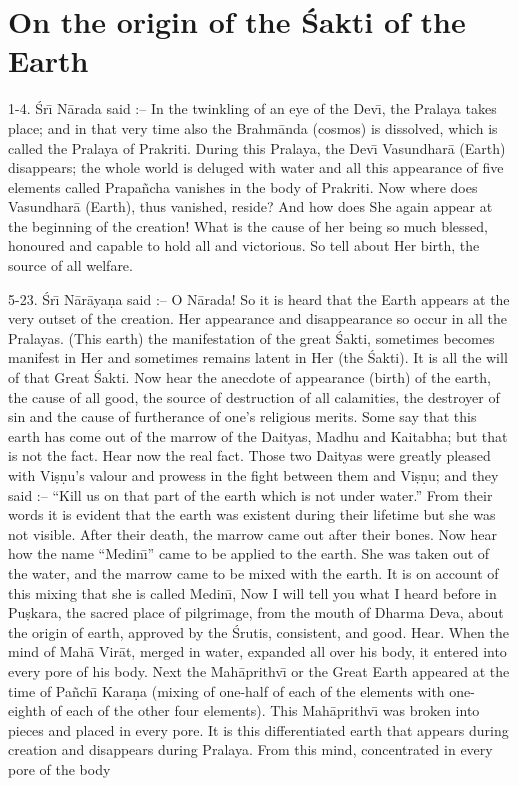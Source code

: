 \chapter{On the origin of the \'Sakti of the Earth}

1-4. \'Sr\={\i} N\=arada said :-- In the twinkling of an eye of the Dev\={\i}, the Pralaya takes place; and in that very time also the Brahm\=anda (cosmos) is dissolved, which is called the Pralaya of Prakriti. During this Pralaya, the Dev\={\i} Vasundhar\=a (Earth) disappears; the whole world is deluged with water and all this appearance of five elements called Prapa\~ncha vanishes in the body of Prakriti. Now where does Vasundhar\=a (Earth), thus vanished, reside? And how does She again appear at the beginning of the creation! What is the cause of her being so much blessed, honoured and capable to hold all and victorious. So tell about Her birth, the source of all welfare.

5-23. \'Sr\={\i} N\=ar\=aya\d{n}a said :-- O N\=arada! So it is heard that the Earth appears at the very outset of the creation. Her appearance and disappearance so occur in all the Pralayas. (This earth) the manifestation of the great \'Sakti, sometimes becomes manifest in Her and sometimes remains latent in Her (the \'Sakti). It is all the will of that Great \'Sakti. Now hear the anecdote of appearance (birth) of the earth, the cause of all good, the source of destruction of all calamities, the destroyer of sin and the cause of furtherance of one's religious merits. Some say that this earth has come out of the marrow of the Daityas, Madhu and Kaitabha; but that is not the fact. Hear now the real fact. Those two Daityas were greatly pleased with Vi\d{s}\d{n}u's valour and prowess in the fight between them and Vi\d{s}\d{n}u; and they said :-- ``Kill us on that part of the earth which is not under water.'' From their words it is evident that the earth was existent during their lifetime but she was not visible. After their death, the marrow came out after their bones. Now hear how the name ``Medin\={\i}'' came to be applied to the earth. She was taken out of the water, and the marrow came to be mixed with the earth. It is on account of this mixing that she is called Medin\={\i}, Now I will tell you what I heard before in Pu\d{s}kara, the sacred place of pilgrimage, from the mouth of Dharma Deva, about the origin of earth, approved by the \'Srutis, consistent, and good. Hear. When the mind of Mah\=a Vir\=at, merged in water, expanded all over his body, it entered into every pore of his body. Next the Mah\=aprithv\={\i} or the Great Earth appeared at the time of Pa\~nch\={\i} Kara\d{n}a (mixing of one-half of each of the elements with one-eighth of each of the other four elements). This Mah\=aprithv\={\i} was broken into pieces and placed in every pore. It is this differentiated earth that appears during creation and disappears during Pralaya. From this mind, concentrated in every pore of the body

